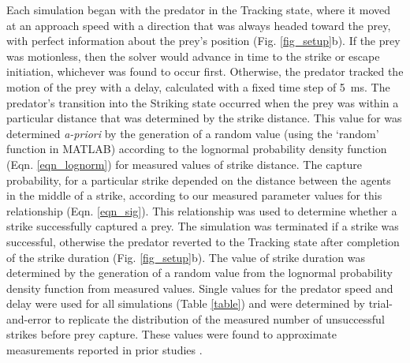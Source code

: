 \documentclass[]{rsos}%
\begin{document}
Each simulation began with the predator in the Tracking state, where it moved at an approach speed with a direction that was always headed toward the prey, with perfect information about the prey's position (Fig. \ref{fig_setup}b). 
If the prey was motionless, then the solver would advance in time to the strike or escape initiation, whichever was found to occur first.
Otherwise, the predator tracked the motion of the prey with a delay, calculated with a fixed time step of \SI{5}{\ms}.  
The predator's transition into the Striking state occurred when the prey was within a particular distance that was determined by the strike distance. 
This value for was determined \textit{a-priori} by the generation of a random value (using the `random' function in MATLAB) according to the lognormal probability density function (Eqn. \ref{eqn_lognorm}) for measured values of strike distance.
The capture probability, for a particular strike depended on the distance between the agents in the middle of a strike, according to our measured parameter values for this relationship (Eqn. \ref{eqn_sig}).
This relationship was used to determine whether a strike successfully captured a prey.
The simulation was terminated if a strike was successful, otherwise the predator reverted to the Tracking state after completion of the strike duration (Fig. \ref{fig_setup}b).
The value of strike duration was determined by the generation of a random value from the lognormal probability density function from measured values.
Single values for the predator speed and delay were used for all simulations (Table \ref{table}) and were determined by trial-and-error to replicate the distribution of the measured number of unsuccessful strikes before prey capture. 
These values were found to approximate measurements reported in prior studies \cite{McHenry:2005tc, Stewart:2013bha}. 
\end{document}
